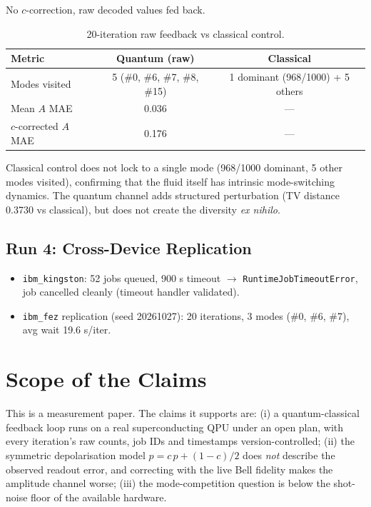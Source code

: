 \documentclass[sigconf,anonymous=false]{acmart}
\begin{document}
No $c$-correction, raw decoded values fed back.

\begin{table}[h]
\centering
\caption{20-iteration raw feedback vs classical control.}
\label{tab:raw20}
\begin{tabular}{lcc}
\toprule
Metric & Quantum (raw) & Classical \\
\midrule
Modes visited & 5 (\#0, \#6, \#7, \#8, \#15) & 1 dominant (968/1000) + 5 others \\
Mean $A$ MAE & 0.036 & --- \\
$c$-corrected $A$ MAE & 0.176 & --- \\
\bottomrule
\end{tabular}
\end{table}

Classical control does not lock to a single mode (968/1000 dominant, 5 other modes visited), confirming that the fluid itself has intrinsic mode-switching dynamics. The quantum channel adds structured perturbation (TV distance 0.3730 vs classical), but does not create the diversity \emph{ex nihilo}.

\subsection{Run 4: Cross-Device Replication}

\begin{itemize}
\item \texttt{ibm\_kingston}: 52 jobs queued, 900 s timeout $\to$ \texttt{RuntimeJobTimeoutError}, job cancelled cleanly (timeout handler validated).
\item \texttt{ibm\_fez} replication (seed 20261027): 20 iterations, 3 modes (\#0, \#6, \#7), avg wait 19.6 s/iter.
\end{itemize}

\section{Scope of the Claims}

\label{sec:scope}

This is a measurement paper. The claims it supports are: (i) a quantum-classical feedback loop
runs on a real superconducting QPU under an open plan, with every iteration's raw counts,
job IDs and timestamps version-controlled; (ii) the symmetric depolarisation model
$p = c\,p + (1-c)/2$ does \emph{not} describe the observed readout error, and correcting with
the live Bell fidelity makes the amplitude channel worse; (iii) the mode-competition question
is below the shot-noise floor of the available hardware.
\end{document}

